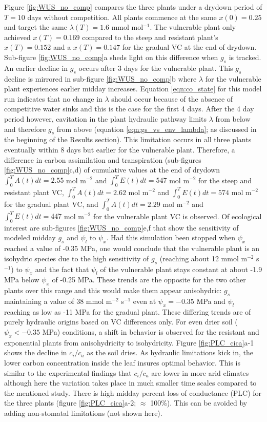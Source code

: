 \documentclass[utf8]{frontiersSCNS} %
\begin{document}
Figure \ref{fig:WUS_no_comp} compares the three plants under a drydown period of $T=10$ days without competition. All plants commence at the same $x(0)=0.25$ and target the same $\lambda(T)=1.6$ mmol mol$^{-1}$. The vulnerable plant only achieved $x(T)=0.169$ compared to the steep and resistant plant's $x(T)=0.152$ and a $x(T)=0.147$ for the gradual VC at the end of drydown. Sub-figure \ref{fig:WUS_no_comp}a sheds light on this difference when $g_s$ is tracked. An earlier decline in $g_s$ occurs after 3 days for the vulnerable plant. This $g_s$ decline is mirrored in sub-figure \ref{fig:WUS_no_comp}b where $\lambda$ for the vulnerable plant experiences earlier midday increases. Equation \ref{eqn:co_state} for this model run indicates that no change in $\lambda$ should occur because of the absence of competitive water sinks and this is the case for the first 4 days. After the 4 day period however, cavitation in the plant hydraulic pathway limits $\lambda$ from below and therefore $g_s$ from above (equation \ref{eqn:gs_vs_env_lambda}; as discussed in the beginning of the Results section). This limitation occurs in all three plants eventually within 8 days but earlier for the vulnerable plant. Therefore, a difference in carbon assimilation and transpiration (sub-figures \ref{fig:WUS_no_comp}c,d) of cumulative values at the end of drydown $\int_0^TA(t)dt= 2.55$ mol m$^{-2}$ and $\int_0^TE(t)dt= 547$ mol m$^{-2}$ for the steep and resistant plant VC, $\int_0^TA(t)dt= 2.62$ mol m$^{-2}$ and $\int_0^TE(t)dt= 574$ mol m$^{-2}$ for the gradual plant VC, and $\int_0^TA(t)dt= 2.29$ mol m$^{-2}$ and $\int_0^TE(t)dt= 447$ mol m$^{-2}$ for the vulnerable plant VC is observed. Of ecological interest are sub-figures \ref{fig:WUS_no_comp}e,f that show the sensitivity of modeled midday $g_s$ and $\psi_l$ to $\psi_x$. Had this simulation been stopped when $\psi_x$ reached a value of -0.35 MPa, one would conclude that the vulnerable plant is an isohydric species due to the high sensitivity of $g_s$ (reaching about 12 mmol m$^{-2}$ s$^{-1}$) to $\psi_x$ and the fact that $\psi_l$ of the vulnerable plant stays constant at about -1.9 MPa below $\psi_x$ of -0.25 MPa. These trends are the opposite for the two other plants over this range and this would make them appear anisohydric: $g_s$ maintaining a value of 38 mmol m$^{-2}$ s$^{-1}$ even at $\psi_x = -0.35$ MPa and $\psi_l$ reaching as low as -11 MPa for the gradual plant. These differing trends are of purely hydraulic origins based on VC differences only. For even drier soil ($\psi_x < -0.35$ MPa) conditions, a shift in behavior is observed for the resistant and exponential plants from anisohydricity to isohydricity. Figure \ref{fig:PLC_cica}a-1 shows the decline in $c_i / c_a$ as the soil dries. As hydraulic limitations kick in, the lower carbon concentration inside the leaf insures optimal behavior. This is similar to the experimental findings that $c_i / c_a$ are lower in more arid climates \citep{prentice2014balancing} although here the variation takes place in much smaller time scales compared to the mentioned study. There is high midday percent loss of conductance (PLC) for the three plants (figure \ref{fig:PLC_cica}a-2; $\approx$ 100\%). This can be avoided by adding non-stomatal limitations (not shown here).
\end{document}
